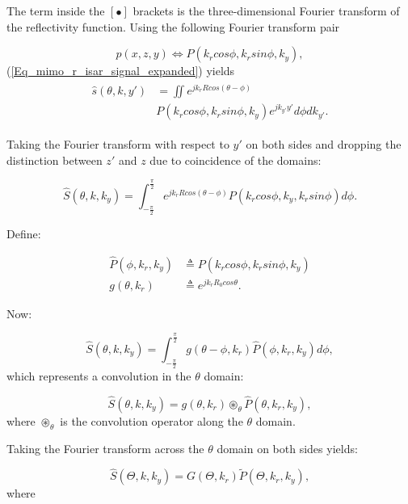 \documentclass[conference]{IEEEtran}
\begin{document}
		The term inside the $[\bullet]$ brackets is the three-dimensional Fourier transform of the reflectivity function. Using the following Fourier transform pair
		
		\begin{equation}
		p(x,z,y) \iff P(k_rcos\phi,k_rsin\phi,k_y),
		\end{equation}
		(\ref{Eq_mimo_r_isar_signal_expanded}) yields
		\begin{align}
		\begin{split}
		\hat{s}(\theta,k,y') &= \iint e^{jk_rRcos(\theta-\phi)} \\
		&P(k_rcos\phi,k_rsin\phi,k_y) e^{jk_{y'}y'}d\phi dk_{y'}.
		\end{split}
		\label{Eq_mimo_r_isar_signal_expanded_2}
		\end{align}
		
		Taking the Fourier transform with respect to $y'$ on both sides and dropping the distinction between $z'$ and $z$ due to coincidence of the domains:
		
		\begin{equation}
		\hat{S}(\theta,k,k_y) = \int_{-\frac{\pi}{2}}^{\frac{\pi}{2}} e^{jk_rRcos(\theta-\phi)} P(k_rcos\phi,k_y,k_rsin\phi)d\phi. 
		\end{equation}
		
		Define:
		
		\begin{align}
		\label{Eq_mimo_r_isar_signal_expanded_3}
		\hat{P}(\phi,k_r,k_y) &\triangleq P(k_rcos\phi,k_rsin\phi,k_y) \\
		g(\theta,k_r) &\triangleq e^{jk_rR_0cos\theta}.
		\end{align}
		
		Now:
		
		\begin{equation}
		\hat{S}(\theta,k,k_y) = \int_{-\frac{\pi}{2}}^{\frac{\pi}{2}} g(\theta-\phi,k_r) \hat{P}(\phi,k_r,k_y)d\phi, 
		\end{equation}
		which represents a convolution in the $\theta$ domain:
		
		\begin{equation}
		\hat{S}(\theta,k,k_y) = g(\theta,k_r) \circledast_\theta \hat{P}(\theta,k_r,k_y),
		\end{equation}
		where $\circledast_\theta$ is the convolution operator along the $\theta$ domain.
		
		Taking the Fourier transform across the $\theta$ domain on both sides yields:
		
		\begin{equation}
		\hat{S}(\Theta,k,k_y) = G(\Theta,k_r)\tilde{P}(\Theta,k_r,k_y),
		\end{equation}
		where
		
\end{document}
